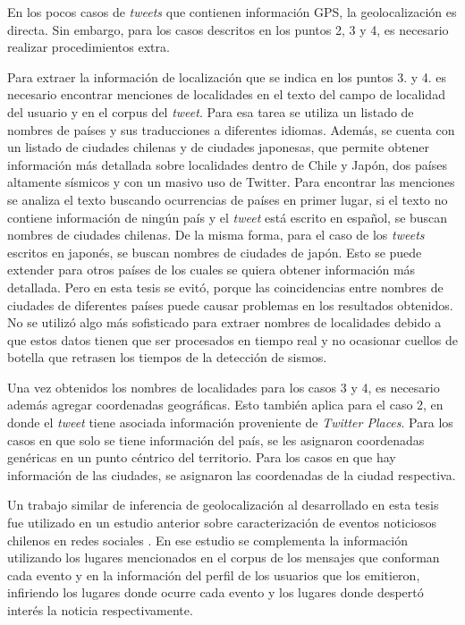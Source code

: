 En los pocos casos de \textit{tweets} que contienen información GPS, la geolocalización es directa. 
%
Sin embargo, para los casos descritos en los puntos 2, 3 y 4, es necesario realizar procedimientos extra. 


Para extraer la información de localización que se indica en los puntos 3. y 4. es necesario encontrar menciones de localidades en el texto del campo de localidad del usuario y en el corpus del \textit{tweet}.  
%
Para esa tarea se utiliza un listado de nombres de países y sus traducciones a diferentes idiomas. 
%
Además, se cuenta con un listado de ciudades chilenas y de ciudades japonesas, que permite obtener información más detallada sobre localidades dentro de Chile y Japón, dos países altamente sísmicos y con un masivo uso de Twitter. 
%
Para encontrar las menciones se analiza el texto buscando ocurrencias de países en primer lugar, si el texto no contiene información de ningún país y el \textit{tweet} está escrito en español, se buscan nombres de ciudades chilenas. De la misma forma, para el caso de los \textit{tweets} escritos en japonés, se buscan nombres de ciudades de japón. 
%
Esto se puede extender para otros países de los cuales se quiera obtener información más detallada. Pero en esta tesis se evitó, porque las coincidencias entre nombres de ciudades de diferentes países puede causar problemas en los resultados obtenidos. 
%
No se utilizó algo más sofisticado para extraer nombres de localidades debido a que estos datos tienen que ser procesados en tiempo real y no ocasionar cuellos de botella que retrasen los tiempos de la detección de sismos.

	
Una vez obtenidos los nombres de localidades para los casos 3 y 4, es necesario además agregar coordenadas geográficas.
%
Esto también aplica para el caso 2, en donde el \textit{tweet} tiene asociada información proveniente de \textit{Twitter Places}.
%
Para los casos en que solo se tiene información del país, se les asignaron coordenadas genéricas en un punto céntrico del territorio. 
%
Para los casos en que hay información de las ciudades, se asignaron las coordenadas de la ciudad respectiva. 


Un trabajo similar de inferencia de geolocalización al desarrollado en esta tesis fue utilizado en un estudio anterior sobre caracterización de eventos noticiosos chilenos en redes sociales \cite{maldonado2015spatio}. En ese estudio se complementa la información utilizando los lugares mencionados en el corpus de los mensajes que conforman cada evento y en la información del perfil de los usuarios que los emitieron, infiriendo los lugares donde ocurre cada evento y los lugares donde despertó interés la noticia respectivamente.

